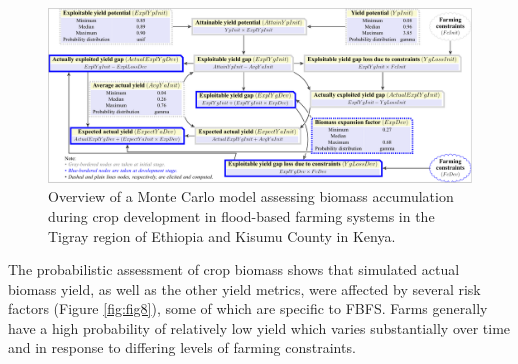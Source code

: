\documentclass[]{elsarticle} %
\begin{document}
\begin{figure}[!h]

{\centering \includegraphics[width=1\linewidth,]{Modelling_FBFS_files/figure-latex/fig7-plot-1} 

}

\caption{Overview of a Monte Carlo model assessing biomass accumulation during crop development in flood-based farming systems in the Tigray region of Ethiopia and Kisumu County in Kenya.}\label{fig:fig7}
\end{figure}

The probabilistic assessment of crop biomass shows that simulated actual biomass yield, as well as the other yield metrics, were affected by several risk factors (Figure \ref{fig:fig8}), some of which are specific to FBFS. Farms generally have a high probability of relatively low yield which varies substantially over time and in response to differing levels of farming constraints.
\end{document}
